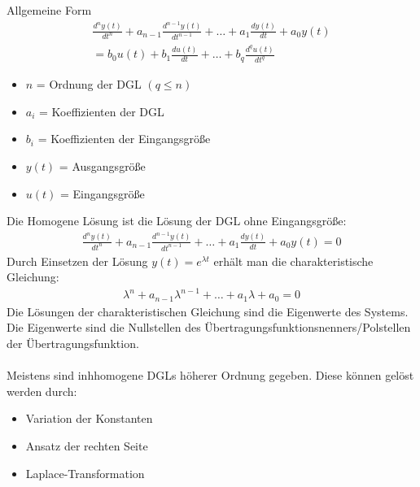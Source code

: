 \documentclass[german]{latex4ei/latex4ei_sheet}
\begin{document}
\begin{sectionbox}{Allgemeine Form}
    \begin{align*}
        \frac{d^n y(t)}{dt^n} + a_{n-1} \frac{d^{n-1} y(t)}{dt^{n-1}} + \ldots + a_1 \frac{dy(t)}{dt} + a_0 y(t) \\= b_0 u(t) + b_1 \frac{du(t)}{dt} + \ldots + b_q \frac{d^q u(t)}{dt^q}
    \end{align*}
    \begin{itemize}
        \item $n$ = Ordnung der DGL $(q \leq n)$
        \item $a_i$ = Koeffizienten der DGL
        \item $b_i$ = Koeffizienten der Eingangsgröße
        \item $y(t)$ = Ausgangsgröße
        \item $u(t)$ = Eingangsgröße

\end{itemize}

Die Homogene Lösung ist die Lösung der DGL ohne Eingangsgröße:
\begin{align*}
    \frac{d^n y(t)}{dt^n} + a_{n-1} \frac{d^{n-1} y(t)}{dt^{n-1}} + \ldots + a_1 \frac{dy(t)}{dt} + a_0 y(t) = 0
\end{align*}
Durch Einsetzen der Lösung $y(t) = e^{\lambda t}$ erhält man die charakteristische Gleichung:
\begin{align*}
    \lambda^n + a_{n-1} \lambda^{n-1} + \ldots + a_1 \lambda + a_0 = 0
\end{align*}
Die Lösungen der charakteristischen Gleichung sind die Eigenwerte des Systems.
Die Eigenwerte sind die Nullstellen des Übertragungsfunktionsnenners/Polstellen der Übertragungsfunktion. \\
\\
Meistens sind inhhomogene DGLs höherer Ordnung gegeben.
Diese können gelöst werden durch:
\begin{itemize}
    \item Variation der Konstanten
    \item Ansatz der rechten Seite
    \item Laplace-Transformation
\end{itemize}
\end{sectionbox}
\end{document}
